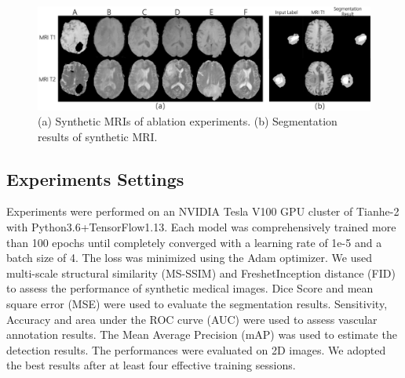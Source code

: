 \documentclass[runningheads]{llncs}
\begin{document}
	\begin{figure}[th]
		\centering
		\includegraphics[width=0.9\linewidth]{figures/ablation}
		\caption{(a) Synthetic MRIs of ablation experiments. (b) Segmentation results of synthetic MRI. }
		\label{ablation_and_seg}
	\end{figure}
	\begin{table}[th]
		\begin{center}
			\caption{Verification experiment of synthetic lesion effectiveness.}
			\label{label_test}
		\end{center}
	\end{table}
	\subsection{Experiments Settings}
	Experiments were performed on an NVIDIA Tesla V100 GPU cluster of Tianhe-2 with Python3.6+TensorFlow1.13. Each model was comprehensively trained more than 100 epochs until completely converged with a learning rate of 1e-5 and a batch size of 4. The loss was minimized using the Adam optimizer. We used multi-scale structural similarity (MS-SSIM) and FreshetInception distance (FID)\cite{100karras2017progressive} to assess the performance of synthetic medical images. Dice Score\cite{95dice1945measures} and mean square error (MSE) were used to evaluate the segmentation results. Sensitivity, Accuracy and area under the ROC curve (AUC) were used to assess vascular annotation results. The Mean Average Precision (mAP) was used to estimate the detection results. The performances were evaluated on 2D images. We adopted the best results after at least four effective training sessions.
\end{document}
